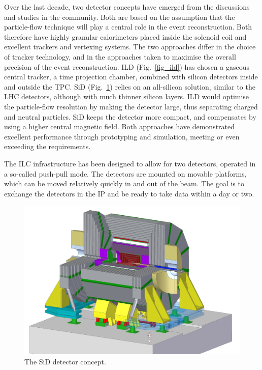 \documentclass[%
 reprint,
 amsmath,amssymb,
 aps,
]{revtex4-1}
\def\Fig#1{Fig.~\ref{#1}}
\begin{document}
Over the last decade, two detector concepts have emerged from the
discussions and studies in the community. Both are based on the assumption that
the 
particle-flow technique will  play a central role in the event
reconstruction. Both therefore have highly granular calorimeters
placed inside the solenoid coil
and excellent trackers and vertexing systems. The two approaches
differ in the choice of tracker technology, and in the approaches taken
to maximise the overall precision of the event reconstruction. ILD
(\Fig{fig_ild}) has chosen a gaseous central tracker, a time
projection chamber, combined with silicon detectors inside and outside
the TPC. SiD (\Fig{fig_sid}) relies on an all-silicon solution,
similar to the
 LHC detectors, although with
much thinner silicon layers. ILD would optimise the particle-flow
resolution by making the detector large, thus separating charged and
neutral particles. SiD keeps the detector more compact, and
compensates by using a higher central magnetic field. Both approaches
have demonstrated excellent performance through prototyping
 and simulation, meeting or even exceeding the requirements. 

The ILC infrastructure has been designed to allow for two detectors,
operated in a so-called push-pull mode. The detectors are mounted on
movable platforms, which can be moved relatively quickly in and out of
the beam. The goal is to exchange the detectors in the IP and be ready
to take data within 
a day or two. 

\begin{figure}[tb]
 \begin{center}
 \includegraphics[width=\hsize]{figures/SiD.jpg}
\caption{The SiD detector concept.
\label{fig_sid}}
 \end{center}
 \vspace{-0.7cm}
 \end{figure}
\end{document}
